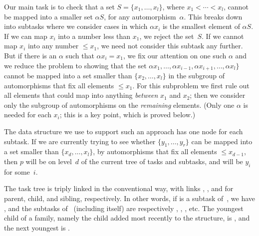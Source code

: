 Our main task is to check that a set $S=\{x_1,\ldots,x_l\}$, where
$x_1<\cdots<x_l$, cannot be mapped into a smaller set $\alpha S$, for
any automorphism~$\alpha$. This breaks down into subtasks where we consider
cases in which $\alpha x_i$ is the smallest element of $\alpha S$. If we
can map $x_i$ into a number less than $x_1$, we reject the set~$S$.
If we cannot map $x_i$ into any number $\le x_1$, we need not consider this
subtask any further. But if there is an $\alpha$ such that $\alpha x_i=x_1$,
we fix our attention on one such $\alpha$ and we reduce the problem to
showing that the set $\alpha x_1,\ldots,\alpha x_{i-1},\alpha x_{i+1},\ldots,
\alpha x_l\}$ cannot be mapped into a set smaller than $\{x_2,\ldots,x_l\}$
in the subgroup of automorphisms that fix all elements $\le x_1$.
For this subproblem we first rule out all elements that could map into anything
{\it between\/} $x_1$ and $x_2$; then we consider only the subgroup of
automorphisms on the {\it remaining\/} elements.
(Only one $\alpha$ is needed for each $x_i$; this is a key point, which
is proved below.)

\fi

The data structure we use to support such an approach
has one node  for
each subtask. If we are currently trying to see whether $\{y_1,\ldots,y_r\}$
can be mapped into a set smaller than $\{x_d,\ldots,x_l\}$, by automorphisms
that fix all elements $\le x_{d-1}$, then $p$ will be on level~$d$ of the
current tree of tasks and subtasks, and  will be $y_i$ for
some~$i$.

The task tree is triply linked in the conventional way, with links
, , and  for parent, child, and sibling,
respectively.
In other words, if  is a subtask of~, we have ,
and the subtasks
of~ (including  itself) are respectively , %
,
, etc.
The youngest child of a family, namely the child
added most recently to the structure, is , and the next
youngest
is .

